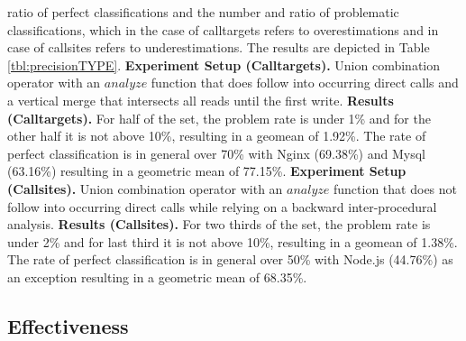  ratio of perfect classifications and the number and ratio of problematic classifications, which in the case of calltargets refers to overestimations and in case of callsites refers to underestimations. 
The results are depicted in Table \ref{tbl:precisionTYPE}.
\textbf{Experiment Setup (Calltargets).} Union combination operator with an $analyze$ function that does follow into occurring direct calls  and a vertical merge that intersects all reads until the first write.
\textbf{Results (Calltargets).} For half of the set, the problem rate is under 1\% and for the other half it is not above 10\%, resulting in a geomean of 1.92\%. The rate of perfect classification is in general over 70\% with Nginx (69.38\%) and Mysql (63.16\%)  resulting in a geometric mean of 77.15\%.
\textbf{Experiment Setup (Callsites).} Union combination operator with an $analyze$ function that does not follow into occurring direct calls while relying on a backward inter-procedural analysis.
\textbf{Results (Callsites).} For two thirds of the set, the problem rate is under 2\% and for last third it is not above 10\%, resulting in a geomean of 1.38\%.  The rate of perfect classification is in general over 50\% 
with Node.js (44.76\%) as an exception resulting in a geometric mean of 68.35\%.


%
%
%
%
\subsection{Effectiveness}
\label{section:typeshieldeffectiveness}

